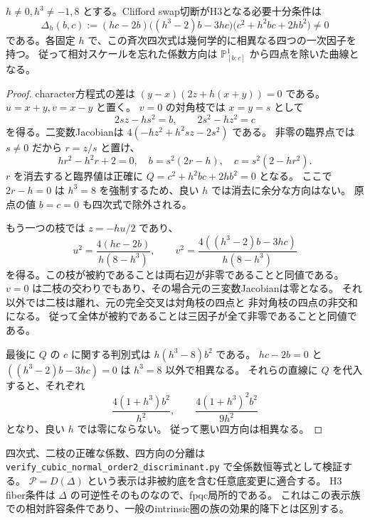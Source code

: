 \begin{theorem}
\label{thm:normal-order2-quartic-admissibility}
$h\ne0,h^3\ne-1,8$ とする。Clifford swap切断がH3となる必要十分条件は
\[
 \Delta_h(b,c):=(hc-2b)\bigl((h^3-2)b-3hc\bigr)
                  \bigl(c^2+h^2bc+2hb^2\bigr)\ne0
\]
である。各固定 $h$ で、この斉次四次式は幾何学的に相異なる四つの一次因子を持つ。
従って相対スケールを忘れた係数方向は
$\mathbb P^1_{[b:c]}$ から四点を除いた曲線となる。
\end{theorem}
\begin{proof}
character方程式の差は $(y-x)(2z+h(x+y))=0$ である。
$u=x+y,v=x-y$ と置く。
$v=0$ の対角枝では $x=y=s$ として
\[
 2sz-hs^2=b,\qquad 2s^2-hz^2=c
\]
を得る。二変数Jacobianは
$4(-hz^2+h^2sz-2s^2)$ である。
非零の臨界点では $s\ne0$ だから $r=z/s$ と置け、
\[
 hr^2-h^2r+2=0,\quad
 b=s^2(2r-h),\quad c=s^2(2-hr^2).
\]
$r$ を消去すると臨界値は正確に
$Q=c^2+h^2bc+2hb^2=0$ となる。
ここで $2r-h=0$ は $h^3=8$ を強制するため、良い $h$ では消去に余分な方向はない。
原点の値 $b=c=0$ も四次式で除外される。

もう一つの枝では $z=-hu/2$ であり、
\[
 u^2=\frac{4(hc-2b)}{h(8-h^3)},\qquad
 v^2=\frac{4((h^3-2)b-3hc)}{h(8-h^3)}
\]
を得る。この枝が被約であることは両右辺が非零であることと同値である。
$v=0$ は二枝の交わりでもあり、その場合元の三変数Jacobianは零となる。
それ以外では二枝は離れ、元の完全交叉は対角枝の四点と
非対角枝の四点の非交和になる。
従って全体が被約であることは三因子が全て非零であることと同値である。

最後に $Q$ の $c$ に関する判別式は $h(h^3-8)b^2$ である。
$hc-2b=0$ と $((h^3-2)b-3hc)=0$ は $h^3=8$ 以外で相異なる。
それらの直線に $Q$ を代入すると、それぞれ
\[
 \frac{4(1+h^3)b^2}{h^2},\qquad
 \frac{4(1+h^3)^2b^2}{9h^2}
\]
となり、良い $h$ では零にならない。
従って悪い四方向は相異なる。
\end{proof}

四次式、二枝の正確な係数、四方向の分離は
\texttt{verify\_cubic\_normal\_order2\_discriminant.py} で全係数恒等式として検証する。
$\mathcal P=D(\Delta)$ という表示は非被約底を含む任意底変更に適合する。
H3 fiber条件は $\Delta$ の可逆性そのものなので、fpqc局所的である。
これはこの表示族での相対許容条件であり、一般のintrinsic圏の族の効果的降下とは区別する。

